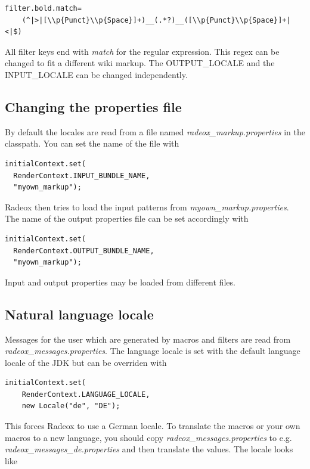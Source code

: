 \documentclass[a4paper,pdftex]{article}
\begin{document}
\begin{verbatim}
filter.bold.match=
    (^|>|[\\p{Punct}\\p{Space}]+)__(.*?)__([\\p{Punct}\\p{Space}]+|<|$)
\end{verbatim}

All filter keys end with {\it match} for the regular expression.
This regex can be changed to fit a different wiki markup. The OUTPUT\_LOCALE and
the INPUT\_LOCALE can be changed independently.

\subsection{Changing the properties file}

By default the locales are read from a file named {\it radeox\_markup.properties} in the
classpath. You can set the name of the file with

\begin{verbatim}
initialContext.set(
  RenderContext.INPUT_BUNDLE_NAME, 
  "myown_markup");
\end{verbatim}

Radeox then tries to load the input patterns from {\it myown\_markup.properties}. The 
name of the output properties file can be set accordingly with
      
\begin{verbatim}
initialContext.set(
  RenderContext.OUTPUT_BUNDLE_NAME, 
  "myown_markup");
\end{verbatim}

Input and output properties may be loaded from different files.

\subsection{Natural language locale}

Messages for the user which are generated by macros and filters are
read from {\it radeox\_messages.properties}. The language locale
is set with the default language locale of the JDK but can be overriden with

\begin{verbatim}
initialContext.set(
    RenderContext.LANGUAGE_LOCALE, 
    new Locale("de", "DE");
\end{verbatim}

This forces Radeox to use a German locale. To translate the macros or your own macros to
a new language, you should copy {\it radeox\_messages.properties} to
e.g.  {\it radeox\_messages\_de.properties} and then translate the values.
The locale looks like
\end{document}
